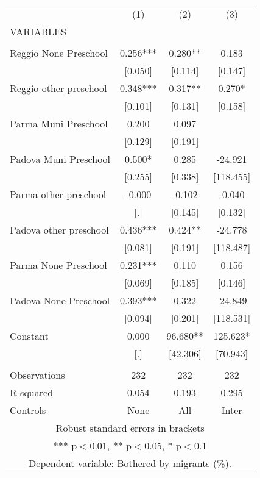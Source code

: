 \begin{tabular}{lccc} \hline
 & (1) & (2) & (3) \\
VARIABLES &  &  &  \\ \hline
 &  &  &  \\
Reggio None Preschool & 0.256*** & 0.280** & 0.183 \\
 & [0.050] & [0.114] & [0.147] \\
Reggio other preschool & 0.348*** & 0.317** & 0.270* \\
 & [0.101] & [0.131] & [0.158] \\
Parma Muni Preschool & 0.200 & 0.097 &  \\
 & [0.129] & [0.191] &  \\
Padova Muni Preschool & 0.500* & 0.285 & -24.921 \\
 & [0.255] & [0.338] & [118.455] \\
Parma other preschool & -0.000 & -0.102 & -0.040 \\
 & [.] & [0.145] & [0.132] \\
Padova other preschool & 0.436*** & 0.424** & -24.778 \\
 & [0.081] & [0.191] & [118.487] \\
Parma None Preschool & 0.231*** & 0.110 & 0.156 \\
 & [0.069] & [0.185] & [0.146] \\
Padova None Preschool & 0.393*** & 0.322 & -24.849 \\
 & [0.094] & [0.201] & [118.531] \\
Constant & 0.000 & 96.680** & 125.623* \\
 & [.] & [42.306] & [70.943] \\
 &  &  &  \\
Observations & 232 & 232 & 232 \\
R-squared & 0.054 & 0.193 & 0.295 \\
 Controls & None & All & Inter \\ \hline
\multicolumn{4}{c}{ Robust standard errors in brackets} \\
\multicolumn{4}{c}{ *** p$<$0.01, ** p$<$0.05, * p$<$0.1} \\
\multicolumn{4}{c}{ Dependent variable: Bothered by migrants (\%).} \\
\end{tabular}
